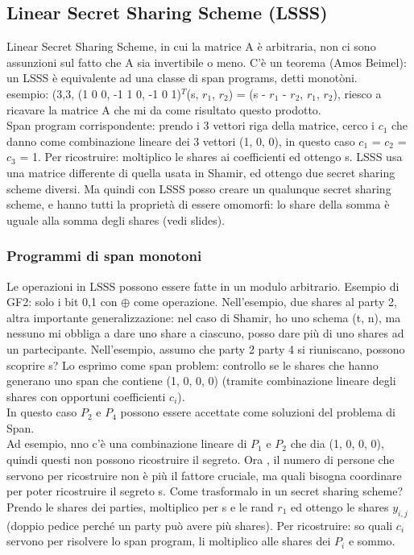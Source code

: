 \documentclass[16px]{article}
\begin{document}
\subsection{Linear Secret Sharing Scheme (LSSS)}
Linear Secret Sharing Scheme, in cui la matrice A è arbitraria, non ci sono assunzioni sul fatto che A sia invertibile o meno. C'è un teorema (Amos Beimel): un LSSS è equivalente ad una classe di span programs, detti monotòni.\\ esempio: (3,3, (1 0 0, -1 1 0, -1 0 1)$^T$(s, $r_1$, $r_2$) = (s - $r_1$ - $r_2$, $r_1$, $r_2$), riesco a ricavare la matrice A che mi da come risultato questo prodotto.\\ Span program corrispondente: prendo i 3 vettori riga della matrice, cerco i $c_1$ che danno come combinazione lineare dei 3 vettori (1, 0, 0), in questo caso $c_1$ = $c_2$ = $c_3$ = 1. Per ricostruire: moltiplico le shares ai coefficienti ed ottengo s. LSSS usa una matrice differente di quella usata in Shamir, ed ottengo due secret sharing scheme diversi. Ma quindi con LSSS posso creare un qualunque secret sharing scheme, e hanno tutti la proprietà di essere omomorfi: lo share della somma è uguale alla somma degli shares (vedi slides).
\subsubsection{Programmi di span monotoni}
Le operazioni in LSSS possono essere fatte in un modulo arbitrario. Esempio di GF2: solo i bit 0,1 con $\oplus$ come operazione. Nell'esempio, due shares al party 2, altra importante generalizzazione: nel caso di Shamir, ho uno schema (t, n), ma nessuno mi obbliga a dare uno share a ciascuno, posso dare più di uno shares ad un partecipante. Nell'esempio, assumo che party 2 party 4 si riuniscano, possono scoprire s? Lo esprimo come span problem: controllo se le shares che hanno generano uno span che contiene (1, 0, 0, 0) (tramite combinazione lineare degli shares con opportuni coefficienti $c_i$).\\ In questo caso $P_2$ e $P_4$ possono essere accettate come soluzioni del problema di Span.\\ Ad esempio, nno c'è una combinazione lineare di $P_1$ e $P_2$ che dia (1, 0, 0, 0), quindi questi non possono ricostruire il segreto. Ora , il numero di persone che servono per ricostruire non è più il fattore cruciale, ma quali bisogna coordinare per poter ricostruire il segreto s. Come trasformalo in un secret sharing scheme? Prendo le shares dei parties, moltiplico per s  e le rand $r_1$ ed ottengo le shares $y_{i,j}$ (doppio pedice perché un party può avere più shares).
Per ricostruire: so quali $c_i$ servono per risolvere lo span program, li moltiplico alle shares dei $P_i$ e sommo.
\end{document}
